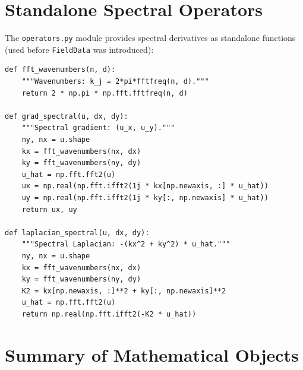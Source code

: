 \documentclass[11pt]{article}
\begin{document}
\section{Standalone Spectral Operators}
\label{sec:operators}

The \texttt{operators.py} module provides spectral derivatives as
standalone functions (used before \texttt{FieldData} was introduced):

\begin{lstlisting}[caption={operators.py --- standalone spectral utilities}]
def fft_wavenumbers(n, d):
    """Wavenumbers: k_j = 2*pi*fftfreq(n, d)."""
    return 2 * np.pi * np.fft.fftfreq(n, d)

def grad_spectral(u, dx, dy):
    """Spectral gradient: (u_x, u_y)."""
    ny, nx = u.shape
    kx = fft_wavenumbers(nx, dx)
    ky = fft_wavenumbers(ny, dy)
    u_hat = np.fft.fft2(u)
    ux = np.real(np.fft.ifft2(1j * kx[np.newaxis, :] * u_hat))
    uy = np.real(np.fft.ifft2(1j * ky[:, np.newaxis] * u_hat))
    return ux, uy

def laplacian_spectral(u, dx, dy):
    """Spectral Laplacian: -(kx^2 + ky^2) * u_hat."""
    ny, nx = u.shape
    kx = fft_wavenumbers(nx, dx)
    ky = fft_wavenumbers(ny, dy)
    K2 = kx[np.newaxis, :]**2 + ky[:, np.newaxis]**2
    u_hat = np.fft.fft2(u)
    return np.real(np.fft.ifft2(-K2 * u_hat))
\end{lstlisting}


\section{Summary of Mathematical Objects}
\label{sec:math_summary}
\end{document}
